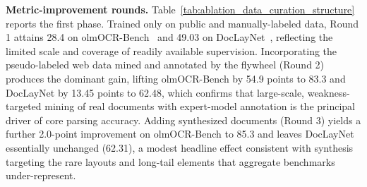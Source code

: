 \begin{table}[htbp]
\centering
\caption{Ablation on the capability-expansion rounds (Rounds 3--5). From the Round 3 baseline, we add element-parsing data and then reasoning and generalization data. `-' denotes no valid output before the corresponding data is added.}
\label{tab:ablation_data_curation_element_reasoning}
\end{table}

\textbf{Metric-improvement rounds.} Table~\ref{tab:ablation_data_curation_structure} reports the first phase. Trained only on public and manually-labeled data, Round 1 attains 28.4 on olmOCR-Bench~\cite{poznanski2025olmocr} and 49.03 on DocLayNet~\cite{pfitzmann2022doclaynet}, reflecting the limited scale and coverage of readily available supervision. Incorporating the pseudo-labeled web data mined and annotated by the flywheel (Round 2) produces the dominant gain, lifting olmOCR-Bench by 54.9 points to 83.3 and DocLayNet by 13.45 points to 62.48, which confirms that large-scale, weakness-targeted mining of real documents with expert-model annotation is the principal driver of core parsing accuracy. Adding synthesized documents (Round 3) yields a further 2.0-point improvement on olmOCR-Bench to 85.3 and leaves DocLayNet essentially unchanged (62.31), a modest headline effect consistent with synthesis targeting the rare layouts and long-tail elements that aggregate benchmarks under-represent.

